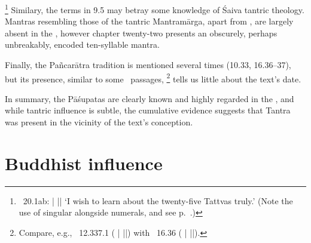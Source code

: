 			\footnote{\VSS\ 20.1ab: 
			 |
			 ||
        `I wish to learn about the twenty-five 
        Tattvas truly.' (Note the use of singular alongside
        numerals, and see
        p.~\pageref{singularwithnumerals}.) }
Similary, the terms  in 9.5 may betray some knowledge of Śaiva tantric theology. Mantras resembling those of the tantric Mantra\-mārga, apart from , are largely absent in the \VSS, however chapter twenty-two presents an obscurely, perhaps unbreakably, encoded ten-syllable mantra.

Finally, the Pañcarātra tradition is mentioned several times (10.33, 16.36--37), but its presence, similar to some \MBH\ passages,%
			\footnote{Compare, e.g., \MBH\ 12.337.1
			( |
		     ||) with
		    \VSS\ 16.36 
		    ( |
			 ||).} 
tells us little about the text's date.						

In summary, the Pāśupatas are clearly known and highly regarded in the \VSS, and while tantric influence is subtle, the cumulative evidence suggests that Tantra was present in the vicinity of the text's conception. 






\section{Buddhist influence}


